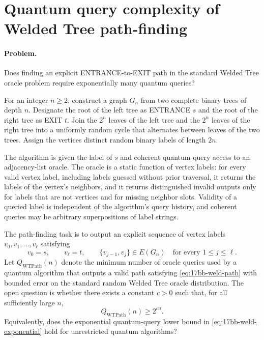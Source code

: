 \section{Quantum query complexity of Welded Tree path-finding}
\label{sec:op_17bba2d8f41697f6}

\paragraph{Problem.}
Does finding an explicit ENTRANCE-to-EXIT path in the standard Welded Tree
oracle problem require exponentially many quantum queries?

For an integer $n\geq 2$, construct a graph $G_n$ from two complete binary
trees of depth $n$.  Designate the root of the left tree as ENTRANCE $s$ and
the root of the right tree as EXIT $t$.  Join the $2^n$ leaves of the left
tree and the $2^n$ leaves of the right tree into a uniformly random cycle
that alternates between leaves of the two trees.  Assign the vertices
distinct random binary labels of length $2n$.

The algorithm is given the label of $s$ and coherent quantum-query access to
an adjacency-list oracle.  The oracle is a static function of vertex labels:
for every valid vertex label, including labels guessed without prior
traversal, it returns the labels of the vertex's neighbors, and it returns
distinguished invalid outputs only for labels that are not vertices and for
missing neighbor slots.  Validity of a queried label is independent of the
algorithm's query history, and coherent queries may be arbitrary
superpositions of label strings.

The path-finding task is to output an explicit sequence of vertex labels
$v_0,v_1,\ldots,v_\ell$ satisfying
\begin{equation}
  v_0=s,
  \qquad
  v_\ell=t,
  \qquad
  \{v_{j-1},v_j\}\in E(G_n)
  \quad
  \text{for every }1\leq j\leq\ell .
  \label{eq:17bb-weld-path}
\end{equation}
Let $Q_{\mathrm{WTPath}}(n)$ denote the minimum number of oracle queries
used by a quantum algorithm that outputs a valid path satisfying
\eqref{eq:17bb-weld-path} with bounded error on the standard random Welded
Tree oracle distribution.  The open question is whether there exists a
constant $c>0$ such that, for all sufficiently large $n$,
\begin{equation}
  Q_{\mathrm{WTPath}}(n)
  \geq
  2^{cn}.
  \label{eq:17bb-weld-exponential}
\end{equation}
Equivalently, does the exponential quantum-query lower bound in
\eqref{eq:17bb-weld-exponential} hold for unrestricted quantum algorithms?

